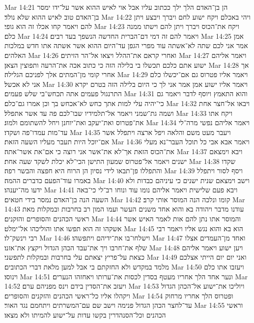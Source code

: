 Mar 14:21  הן בן־האדם הלך ילך ככתוב עליו אבל אוי לאיש ההוא אשר על־ידו ימסר בן־האדם טוב לאיש ההוא שלא נולד׃
Mar 14:22  ויהי באכלם ויקח ישוע לחם ויברך ויבצע ויתן להם ויאמר קחו אכלו זה הוא גופי׃
Mar 14:23  ויקח את־הכוס ויברך ויתן להם וישתו ממנה כלם׃
Mar 14:24  ויאמר להם זה דמי דם־הברית החדשה הנשפך בעד רבים׃
Mar 14:25  אמן אמר אני לכם שתה לא־אשתה עוד מפרי הגפן עד־היום ההוא אשר אשתה אתו חדש במלכות האלהים׃
Mar 14:26  ואחרי קראם את־ההלל ויצאו אל־הר הזיתים׃
Mar 14:27  ויאמר אליהם ישוע אתם כלכם תכשלו בי בלילה הזה כי כתוב אכה את־הרעה ותפוצין הצאן׃
Mar 14:28  אך אחרי קומי מן־המתים אלך לפניכם הגלילה׃
Mar 14:29  ויאמר אליו פטרוס גם אם־יכשלו כלם אני לא אכשל׃
Mar 14:30  ויאמר אליו ישוע אמן אמר אני לך כי היום בלילה הזה בטרם יקרא התרנגול פעמים אתה תכחש־בי שלש פעמים׃
Mar 14:31  והוא התאמץ ויוסף לדבר ויאמר גם כי־יהיה עלי למות אתך כחש לא־אכחש בך וכן אמרו גם־כלם׃
Mar 14:32  ויבאו אל־חצר אחת ושמה גת־שמני ויאמר אל־תלמידיו שבו־לכם פה עד אשר אתפלל׃
Mar 14:33  ויקח אתו את־פטרוס ואת־יעקב ואת־יוחנן ויחל להשתומם ולמוג׃
Mar 14:34  ויאמר אליהם נפשי מרה־לי עד־מות עמדו־פה ושקדו׃
Mar 14:35  ויעבר מעט משם והלאה ויפל ארצה ויתפלל אשר אם־יוכל היות תעבר מעליו השעה הזאת׃
Mar 14:36  ויאמר אבא אבי כל תוכל העבר־נא מעלי את־הכוס הזאת אך־לא את־אשר אני רוצה כי אם־את אשר־אתה׃
Mar 14:37  ויבא וימצאם ישנים ויאמר אל־פטרוס שמעון התישן הכי־לא יכלת לשקד שעה אחת׃
Mar 14:38  שקדו והתפללו פן־תבאו לידי נסיון הן הרוח היא חפצה והבשר רפה׃
Mar 14:39  ויסף לסור ויתפלל באמרו עוד־הפעם כדברים ההמה׃
Mar 14:40  וישב וימצאם שנית ישנים כי עיניהם כבדות ולא ידעו מה־יענהו׃
Mar 14:41  ויבא פעם שלישית ויאמר אליהם נומו עוד ונוחו רב־לי כי־באה השעה הנה בן־האדם נמסר בידי חטאים׃
Mar 14:42  קומו ונלכה הנה המוסר אותי קרב׃
Mar 14:43  עודנו מדבר ויהודה בא והוא אחד משנים העשר ועמו המון רב בחרבות ובמקלות מאת ראשי הכהנים והסופרים והזקנים׃
Mar 14:44  והמוסר אתו נתן להם אות לאמר האיש אשר אשקהו זה הוא תפשו אתו והוליכהו אל־ימלט׃
Mar 14:45  הוא בא והוא נגש אליו ויאמר רבי רבי וינשק־לו׃
Mar 14:46  וישלחו־בו את־ידיהם ויתפשהו׃
Mar 14:47  ואחד מן־העמדים אצלו שלף את־חרבו ויך את־עבד הכהן הגדול ויקצץ את־אזנו׃
Mar 14:48  ויען ישוע ויאמר אליהם כצאת על־פריץ יצאתם עלי בחרבות ובמקלות לתפשני׃
Mar 14:49  ואני יום יום הייתי אצלכם מלמד במקדש ולא החזקתם בי אבל למען מלאת דברי הכתובים׃
Mar 14:50  ויעזבו אתו כלם וינוסו׃
Mar 14:51  ונער אחד הלך אחריו מעטף בסדין לכסות את־ערותו ויאחזהו הנערים׃
Mar 14:52  ויעזב את־הסדין בידם וינס מפניהם ערם׃
Mar 14:53  ויוליכו את־ישוע אל־הכהן הגדול ויקהלו אליו כל־ראשי הכהנים והזקנים והסופרים׃
Mar 14:54  ופטרוס הלך אחריו מרחוק עד־לחצר הכהן הגדול פנימה וישב שם עם־המשרתים ויתחמם נגד האור׃
Mar 14:55  וראשי הכהנים וכל־הסנהדרין בקשו עדות על־ישוע להמיתו ולא מצאו׃
